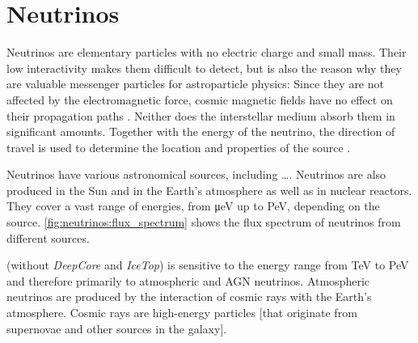 \section{Neutrinos}

Neutrinos are elementary particles with no electric charge and small mass. %
Their low interactivity
  makes them difficult to detect,
  but is also the reason why they are valuable messenger particles for astroparticle physics:
Since they are not affected by the electromagnetic force,
  cosmic magnetic fields have no effect on their propagation paths \cite{neutrinos_katz}.
Neither does the interstellar medium absorb them in significant amounts.
Together with the energy of the neutrino,
  the direction of travel %
  is used to determine the location and properties of the source \cite{neutrinos_katz}.


Neutrinos have various astronomical sources,
including
  …. %
Neutrinos are also produced in
  the Sun
  and in the Earth's atmosphere
  as well as in nuclear reactors.
They cover a vast range of energies, from \si{\micro\electronvolt} up to \si{\peta\electronvolt},
  depending on the source. \citationneeded{}
\autoref{fig:neutrinos:flux_spectrum} shows the flux spectrum of neutrinos from different sources.

\icecube{}
  (without \emph{DeepCore} and \emph{IceTop})
is sensitive to
  the energy range from \si{\tera\electronvolt} to \si{\peta\electronvolt} \cite{icecube_aartsen}
  and therefore primarily to atmospheric and AGN neutrinos.
%
Atmospheric neutrinos are produced by the interaction of cosmic rays with the Earth's atmosphere.
Cosmic rays are high-energy particles
  [that originate from supernovae and other sources in the galaxy].




